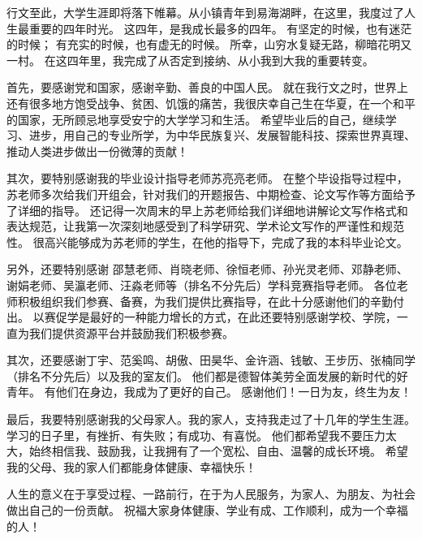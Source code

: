 \thesisacknowledgement
行文至此，大学生涯即将落下帷幕。从小镇青年到易海湖畔，在这里，我度过了人生最重要的四年时光。
这四年，是我成长最多的四年。
有坚定的时候，也有迷茫的时候；
有充实的时候，也有虚无的时候。
所幸，山穷水复疑无路，柳暗花明又一村。
在这四年里，我完成了从否定到接纳、从小我到大我的重要转变。

首先，要感谢党和国家，感谢辛勤、善良的中国人民。
就在我行文之时，世界上还有很多地方饱受战争、贫困、饥饿的痛苦，我很庆幸自己生在华夏，在一个和平的国家，无所顾忌地享受安宁的大学学习和生活。
希望毕业后的自己，继续学习、进步，用自己的专业所学，为中华民族复兴、发展智能科技、探索世界真理、推动人类进步做出一份微薄的贡献！

其次，要特别感谢我的毕业设计指导老师苏亮亮老师。
在整个毕设指导过程中，苏老师多次给我们开组会，针对我们的开题报告、中期检查、论文写作等方面给予了详细的指导。
还记得一次周末的早上苏老师给我们详细地讲解论文写作格式和表达规范，让我第一次深刻地感受到了科学研究、学术论文写作的严谨性和规范性。
很高兴能够成为苏老师的学生，在他的指导下，完成了我的本科毕业论文。

另外，还要特别感谢
邵慧老师、肖晓老师、徐恒老师、孙光灵老师、邓静老师、谢娟老师、吴瀛老师、汪淼老师等（排名不分先后）学科竞赛指导老师。
各位老师积极组织我们参赛、备赛，为我们提供比赛指导，在此十分感谢他们的辛勤付出。
以赛促学是最好的一种能力增长的方式，在此还要特别感谢学校、学院，一直为我们提供资源平台并鼓励我们积极参赛。

其次，还要感谢丁宇、范奚鸣、胡傲、田昊华、金许涵、钱敏、王步历、张楠同学（排名不分先后）以及我的室友们。
他们都是德智体美劳全面发展的新时代的好青年。
有他们在身边，我成为了更好的自己。
感谢他们！一日为友，终生为友！

最后，我要特别感谢我的父母家人。我的家人，支持我走过了十几年的学生生涯。
学习的日子里，有挫折、有失败；有成功、有喜悦。
他们都希望我不要压力太大，始终相信我、鼓励我，让我拥有了一个宽松、自由、温馨的成长环境。
希望我的父母、我的家人们都能身体健康、幸福快乐！

人生的意义在于享受过程、一路前行，在于为人民服务，为家人、为朋友、为社会做出自己的一份贡献。
祝福大家身体健康、学业有成、工作顺利，成为一个幸福的人！

